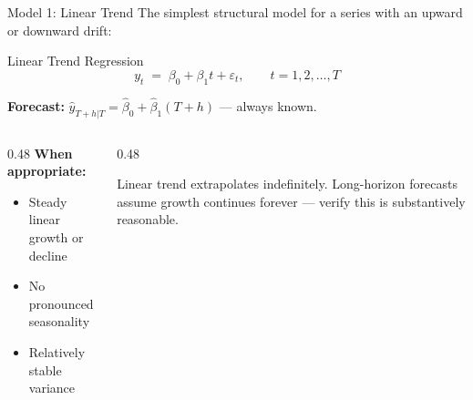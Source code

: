 \documentclass[aspectratio=169, 11pt]{beamer}
\begin{document}
\begin{frame}{Model 1: Linear Trend}
  The simplest structural model for a series with an upward or downward drift:
  \begin{definitionbox}{Linear Trend Regression}
    \[
      y_t \;=\; \beta_0 + \beta_1 t + \varepsilon_t,
      \qquad t = 1, 2, \ldots, T
    \]
  \end{definitionbox}
  \vspace{0.1cm}
  \textbf{Forecast:} $\hat{y}_{T+h|T} = \hat{\beta}_0 + \hat{\beta}_1(T+h)$ --- always known.

  \vspace{0.15cm}
  \begin{columns}[T]
    \begin{column}{0.48\textwidth}
      \textbf{When appropriate:}
      \begin{itemize}
        \item Steady linear growth or decline
        \item No pronounced seasonality
        \item Relatively stable variance
      \end{itemize}
    \end{column}
    \begin{column}{0.48\textwidth}
      \begin{warningbox}
        \small
        Linear trend extrapolates indefinitely.
        Long-horizon forecasts assume growth
        continues forever --- verify this is
        substantively reasonable.
      \end{warningbox}
    \end{column}
  \end{columns}
\end{frame}
\end{document}
